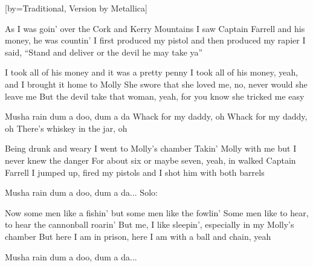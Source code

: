 
[by={Traditional, Version by Metallica}]

\chordson

\beginverse
As I was goin' over the Cork and Kerry Mountains
I saw Captain Farrell and his money, he was countin'
I first produced my pistol and then produced my rapier
I said, ``Stand and deliver or the devil he may take ya''
\endverse

\beginverse
I took all of his money and it was a pretty penny
I took all of his money, yeah, and I brought it home to Molly
She swore that she loved me, no, never would she leave me
But the devil take that woman, yeah, for you know she tricked me easy
\endverse

\beginchorus
Musha rain dum a doo, dum a da
Whack for my daddy, oh
Whack for my daddy, oh
There's whiskey in the jar, oh
\endchorus

\beginverse
Being drunk and weary I went to Molly's chamber
Takin' Molly with me but I never knew the danger
For about six or maybe seven, yeah, in walked Captain Farrell
I jumped up, fired my pistols and I shot him with both barrels
\endverse

\beginchorus
Musha rain dum a doo, dum a da...
Solo:
\endchorus

\beginverse
Now some men like a fishin' but some men like the fowlin'
Some men like to hear, to hear the cannonball roarin'
But me, I like sleepin', especially in my Molly's chamber
But here I am in prison, here I am with a ball and chain, yeah
\endverse

\beginchorus
Musha rain dum a doo, dum a da...
\endchorus

\vspace{7cm}

\endsong